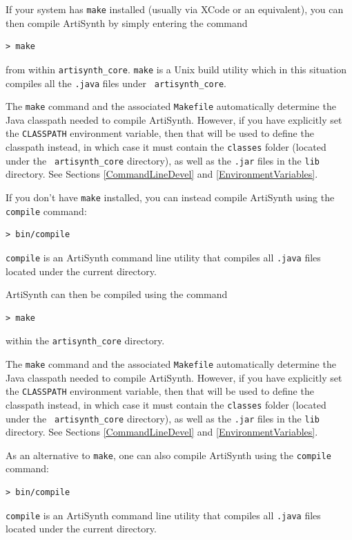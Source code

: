 If your system has {\tt make} installed (usually via XCode or
an equivalent), you can then compile ArtiSynth by simply entering
the command 
%
\begin{lstlisting}[]
 > make
\end{lstlisting}
%
from within {\tt artisynth\_core}. {\tt make} is a Unix build utility
which in this situation compiles all the {\tt .java} files under {\tt
artisynth\_core}. 

\begin{sideblock}
The {\tt make} command and the associated {\tt Makefile} automatically
determine the Java classpath needed to compile ArtiSynth.  However, if
you have explicitly set the {\tt CLASSPATH} environment variable, then
that will be used to define the classpath instead, in which case it
must contain the {\tt classes} folder (located under the {\tt
artisynth\_core} directory), as well as the {\tt .jar} files in the
{\tt lib} directory. See Sections \ref{CommandLineDevel}
and \ref{EnvironmentVariables}.
\end{sideblock}

If you don't have {\tt make} installed, you can instead compile
ArtiSynth using the {\tt compile} command:
%
\begin{lstlisting}[]
 > bin/compile
\end{lstlisting}
%
{\tt compile} is an ArtiSynth command line utility that compiles all
{\tt .java} files located under the current directory.
\fi %
\ifLinux

ArtiSynth can then be compiled using the command
%
\begin{lstlisting}[]
 > make
\end{lstlisting}
%
within the {\tt artisynth\_core} directory. 

\begin{sideblock}
The {\tt make} command and the associated {\tt Makefile} automatically
determine the Java classpath needed to compile ArtiSynth.  However, if
you have explicitly set the {\tt CLASSPATH} environment variable, then
that will be used to define the classpath instead, in which case it
must contain the {\tt classes} folder (located under the {\tt
artisynth\_core} directory), as well as the {\tt .jar} files in the
{\tt lib} directory. See Sections \ref{CommandLineDevel}
and \ref{EnvironmentVariables}.
\end{sideblock}

As an alternative to {\tt make}, one can also compile ArtiSynth using the
{\tt compile} command:
%
\begin{lstlisting}[]
 > bin/compile
\end{lstlisting}
%
{\tt compile} is an ArtiSynth command line utility that compiles all
{\tt .java} files located under the current directory.
\fi %

